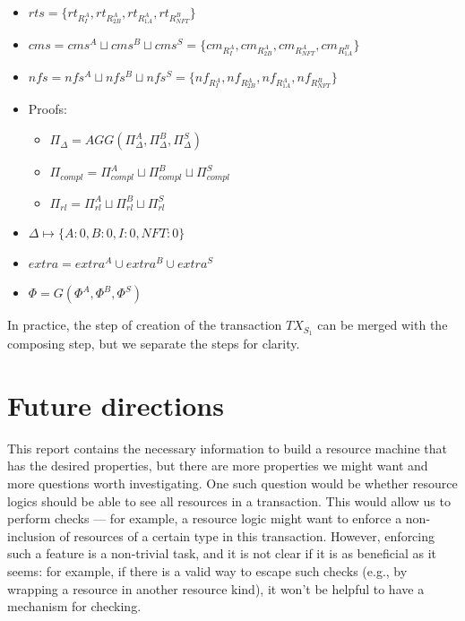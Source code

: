 \documentclass[
    11pt,            %
    techreport,        %
    affiltop,       %
]{art}
\begin{document}
\begin{itemize}
    \item $rts= \{rt_{R^A_{I}},
    rt_{R^A_{2B}},
    rt_{R^A_{1A}},  rt_{R^B_{NFT}}\}$
    \item $cms = cms^{A} \sqcup cms^B \sqcup cms^S = \{
    cm_{R^A_I}, cm_{R^A_{2B}}, cm_{R^A_{NFT}}, cm_{R^B_{1A}}\}$
    \item $nfs = nfs^A \sqcup nfs^B \sqcup nfs^S = \{nf_{R^A_{I}},
    nf_{R^A_{2B}},
    nf_{R^A_{1A}},  nf_{R^B_{NFT}}\}$
    \item Proofs:
    \begin{itemize}
        \item $\Pi_{\Delta} = AGG(\Pi^A_{\Delta}, \Pi^B_{\Delta}, \Pi^S_{\Delta})$
        \item $\Pi_{compl} = \Pi^A_{compl} \sqcup \Pi^B_{compl} \sqcup \Pi^S_{compl}$
        \item $\Pi_{rl} = \Pi^A_{rl} \sqcup \Pi^B_{rl} \sqcup \Pi^S_{rl}$
    \end{itemize}

    \item $\Delta \mapsto \{A: 0, B: 0, I: 0, NFT: 0\}$
    \item $extra = extra^A \cup extra^B \cup extra^S$
    \item $\Phi = G(\Phi^A, \Phi^B, \Phi^S)$
\end{itemize}

In practice, the step of creation of the transaction $TX_{S_1}$ can be merged with the composing step, but we separate the steps for clarity.

\section{Future directions}

This report contains the necessary information to build a resource machine that has the desired properties, but there are more properties we might want and more questions worth investigating. One such question would be whether resource logics should be able to see all resources in a transaction. This would allow us to perform  checks — for example, a resource logic might want to enforce a non-inclusion of resources of a certain type in this transaction. However, enforcing such a feature is a non-trivial task, and it is not clear if it is as beneficial as it seems: for example, if there is a valid way to escape such checks (e.g., by wrapping a resource in another resource kind), it won’t be helpful to have a mechanism for checking. 
\end{document}
